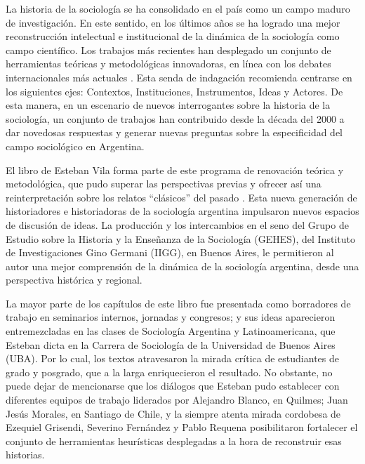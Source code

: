 {La historia de la sociología se ha consolidado en el país como un campo maduro de investigación. En este sentido, en los últimos años se ha logrado una mejor reconstrucción intelectual e institucional de la dinámica de la sociología como campo científico. Los trabajos más recientes han desplegado un conjunto de herramientas teóricas y metodológicas innovadoras, en línea con los debates internacionales más actuales \parencite{1559-CHAPOULIE2009,1562-COLLYER2021,1563-FLECK2015}. Esta senda de indagación recomienda centrarse en los siguientes ejes: Contextos, Instituciones, Instrumentos, Ideas y Actores. De esta manera, en un escenario de nuevos interrogantes sobre la historia de la sociología, un conjunto de trabajos han contribuido desde la década del 2000 a dar novedosas respuestas y generar nuevas preguntas sobre la especificidad del campo sociológico en Argentina.

El libro de Esteban Vila forma parte de este programa de renovación teórica y metodológica, que pudo superar las perspectivas previas y ofrecer así una reinterpretación sobre los relatos \enquote{clásicos} del pasado \parencite{1547-NOE2005,1550-BLOIS2018,1565-BLANCO2006,1665-PEREYRA2007,1666-PEREYRA2022,1670-GONZALEZBOLLO1999,1923-PEREYRA2010}. Esta nueva generación de historiadores e historiadoras de la sociología argentina impulsaron nuevos espacios de discusión de ideas. La producción y los intercambios en el seno del Grupo de Estudio sobre la Historia y la Enseñanza de la Sociología (GEHES), del Instituto de Investigaciones Gino Germani (IIGG), en Buenos Aires, le permitieron al autor una mejor comprensión de la dinámica de la sociología argentina, desde una perspectiva histórica y regional.

La mayor parte de los capítulos de este libro fue presentada como borradores de trabajo en seminarios internos, jornadas y congresos; y sus ideas aparecieron entremezcladas en las clases de Sociología Argentina y Latinoamericana, que Esteban dicta en la Carrera de Sociología de la Universidad de Buenos Aires (UBA). Por lo cual, los textos atravesaron la mirada crítica de estudiantes de grado y posgrado, que a la larga enriquecieron el resultado. No obstante, no puede dejar de mencionarse que los diálogos que Esteban pudo establecer con diferentes equipos de trabajo liderados por Alejandro Blanco, en Quilmes; Juan Jesús Morales, en Santiago de Chile, y la siempre atenta mirada cordobesa de Ezequiel Grisendi, Severino Fernández y Pablo Requena posibilitaron fortalecer el conjunto de herramientas heurísticas desplegadas a la hora de reconstruir esas historias.

}
